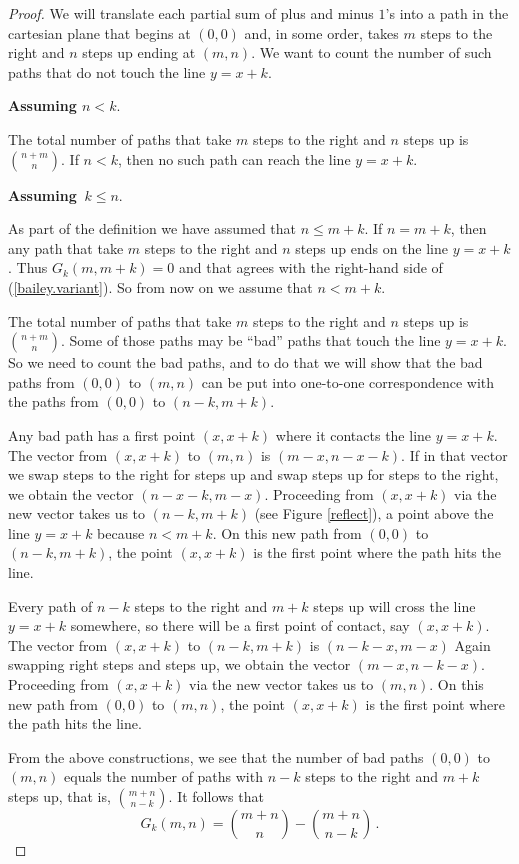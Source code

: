 \documentclass[12pt]{amsart}
\theoremstyle{definition}
\theoremstyle{theorem}
\begin{document}
\begin{proof}  
We will translate each partial sum of plus and minus $1$'s
into a path in the cartesian plane that begins at $(0,0)$ and, in some order,
takes $m$ steps to the right and $n$ steps up ending 
at $(m,n)$. We want to count the
number of such paths that do not touch the line $y=x+k$.

\medskip
\noindent
\textbf{Assuming \boldmath $n< k.$}

\noindent
The total number of paths that take $m$ steps to the right and $n$ steps up
is $\binom{n+m}{n}$. If  $n<k$, then no such path can reach the line
$y=x+k$. 

\medskip
\noindent
\textbf{Assuming} {\boldmath$\ k\leq n$.}

\noindent
As part of the definition  we have assumed  that $n\leq m+k$.
If $n= m+k$, then any path  that take $m$ steps to the right and $n$ steps up
ends on the line $y=x+k$. Thus $G_k(m,m+k) = 0$ and that agrees with the right-hand side
of (\ref{bailey.variant}). So from now on we assume that $n< m+k$.

\medskip
The total number of paths that take $m$ steps to the right and $n$ steps up
is $\binom{n+m}{n}$. Some of those paths may be ``bad'' paths that
touch the line $y=x+k$. So we need to count the bad paths,
and to do that we will show that the  bad paths
from $(0,0)$ to $(m,n)$
can be put into one-to-one correspondence with 
the  paths from $(0,0)$ to $(n-k,m+k)$.

Any bad path has a first point $(x,x+k)$ where it contacts the line $y=x+k$.
The vector from $(x,x+k)$ to $(m,n)$ is $(m-x,n-x-k)$. If 
in that vector we swap steps to
the right for steps up and swap steps up for steps to the right, we obtain the
vector $(n-x-k,m-x)$. Proceeding from $(x,x+k)$ via the new vector takes
us to $(n-k,m+k)$   (see Figure  \ref{reflect}), a point above the line $y=x+k$ because $n<m+k$.
On this new path from $(0,0)$ to $(n-k,m+k)$, the point $(x,x+k)$ is the
first point where the path hits the line. 

Every path of $n-k$ steps to the right and $m+k$ steps up will cross the
line $y=x+k$ somewhere, so there will be a first point of contact, say 
$(x,x+k)$. The vector from $(x,x+k)$  to  $(n-k,m+k)$ is 
$(n-k-x, m-x)$  Again swapping right steps and steps up, we obtain
the vector $(m-x, n-k-x)$.  Proceeding from $(x,x+k)$ via the new vector takes
us to $(m,n)$. On this new path from $(0,0)$ to $(m,n)$, the point $(x,x+k)$ is the
first point where the path hits the line.

From the above constructions, we see that  the number of bad paths 
$(0,0)$ to $(m,n)$
equals the number of paths with
 $n-k$ steps to the right and $m+k$ steps up, that is, $\binom{m+n}{n-k}$.
 It follows that
 $$
 G_k(m,n) = \binom{m+n}{n} - \binom{m+n}{n-k}
 \,.
 $$
\end{proof}
\end{document}
